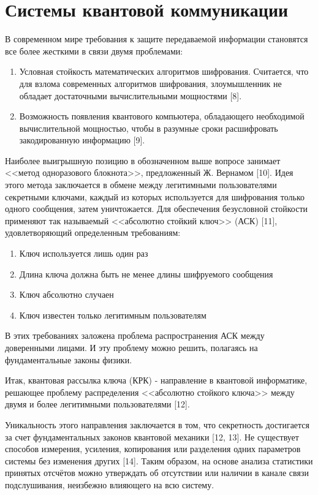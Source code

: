 
\section{Системы квантовой коммуникации} \label{sec:ch1/sec2}

В современном мире требования к защите передаваемой  информации становятся все более жесткими в связи двумя проблемами:
\begin{enumerate}
	\item Условная стойкость математических алгоритмов шифрования.
Считается, что для взлома современных алгоритмов шифрования, злоумышленник не обладает достаточными вычислительными мощностями [8].
	\item Возможность появления квантового компьютера, обладающего необходимой вычислительной мощностью, чтобы в разумные сроки расшифровать закодированную информацию [9].
\end{enumerate} 


Наиболее выигрышную позицию в обозначенном выше вопросе занимает <<метод одноразового блокнота>>, предложенный Ж. Вернамом [10]. Идея этого метода заключается в обмене между легитимными пользователями секретными ключами, каждый из которых используется для шифрования только одного сообщения,  затем уничтожается. Для обеспечения безусловной стойкости применяют так называемый <<абсолютно стойкий ключ>> (АСК) [11], удовлетворяющий определенным требованиям:

\begin{enumerate}
	\item Ключ используется лишь один раз
	\item Длина ключа должна быть не менее длины шифруемого сообщения
	\item Ключ абсолютно случаен
	\item Ключ известен только легитимным пользователям
\end{enumerate}


В этих требованиях заложена проблема распространения АСК между доверенными лицами. И эту проблему можно решить, полагаясь на фундаментальные законы физики.


Итак, квантовая рассылка ключа (КРК) - направление в квантовой информатике, решающее проблему распределения <<абсолютно стойкого ключа>> между двумя и более легитимными пользователями [12].


Уникальность этого направления заключается в том, что секретность достигается за счет фундаментальных законов квантовой механики [12, 13]. Не существует способов измерения, усиления, копирования или разделения одних параметров системы без изменения других [14]. Таким образом, на основе анализа статистики принятых отсчётов можно утверждать об отсутствии или наличии в канале связи подслушивания, неизбежно влияющего на всю систему.


